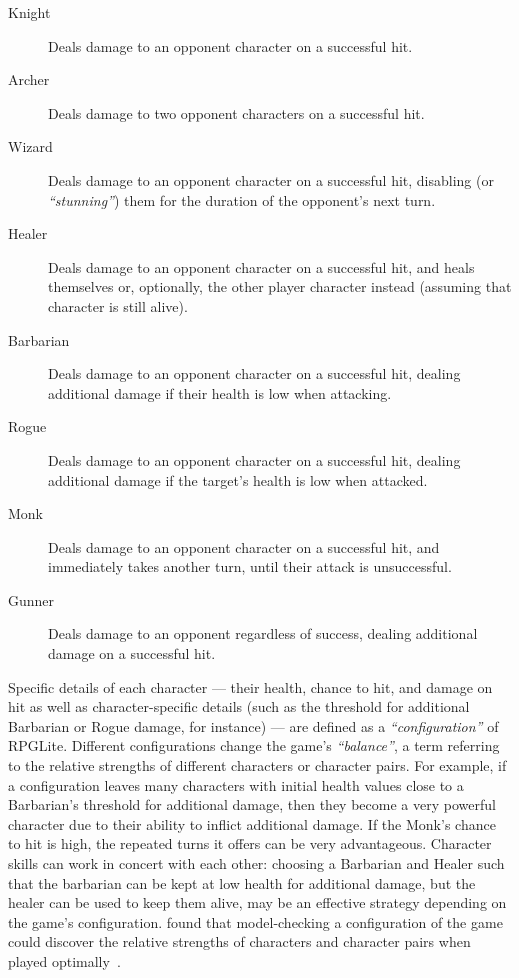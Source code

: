 \begin{description} \item[Knight] Deals damage to an opponent character on a
successful hit.  \item[Archer] Deals damage to two opponent characters on a
successful hit.  \item[Wizard] Deals damage to an opponent character on a
successful hit, disabling (or \emph{``stunning''}) them for the duration of the
opponent's next turn.  \item[Healer] Deals damage to an opponent character on a
successful hit, and heals themselves or, optionally, the other player character
instead (assuming that character is still alive).  \item[Barbarian] Deals damage
to an opponent character on a successful hit, dealing additional damage if
their
health is low when attacking.  \item[Rogue] Deals damage to an opponent
character on a successful hit, dealing additional damage if the target's health
is low when attacked.  \item[Monk] Deals damage to an opponent character on a
successful hit, and immediately takes another turn, until their attack is
unsuccessful.  \item[Gunner] Deals damage to an opponent regardless of success,
dealing additional damage on a successful hit.  \end{description}

Specific details of each character --- their health, chance to hit, and damage
on hit as well as character-specific details (such as the threshold for
additional Barbarian or Rogue damage, for instance) --- are defined as a
\emph{``configuration''} of RPGLite. Different configurations change the game's
\emph{``balance''}, a term referring to the relative strengths of different
characters or character pairs. For example, if a configuration leaves many
characters with initial health values close to a Barbarian's threshold for
additional damage, then they become a very powerful character due to their
ability to inflict additional damage. If the Monk's chance to hit is high, the
repeated turns it offers can be very advantageous. Character skills can work in
concert with each other: choosing a Barbarian and Healer such that the barbarian
can be kept at low health for additional damage, but the healer can be used to
keep them alive, may be an effective strategy depending on the game's
configuration. \citeauthor{kavanagh2019balancing} found that model-checking a
configuration of the game could discover the relative strengths of characters
and character pairs when played optimally~\cite{kavanagh2019balancing}.


